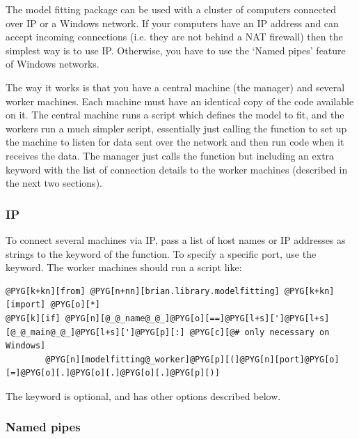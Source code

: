 \documentclass[letterpaper,10pt,english]{manual}
\begin{document}
The model fitting package can be used with a cluster of computers connected over
IP or a Windows network. If your computers have an IP address and can accept
incoming connections (i.e. they are not behind a NAT firewall) then the simplest
way is to use IP. Otherwise, you have to use the `Named pipes' feature of
Windows networks.

The way it works is that you have a central machine (the manager) and several
worker machines. Each machine must have an identical copy of the code available
on it. The central machine runs a script which defines the model to fit, and
the workers run a much simpler script, essentially just calling the
\hyperlink{brian.library.modelfitting.modelfitting_worker}{} function to set up the machine to listen for data
sent over the network and then run code when it receives the data. The manager
just calls the \hyperlink{brian.library.modelfitting.modelfitting}{} function but including an extra keyword
 with the list of connection details to the worker machines
(described in the next two sections).


\subsubsection{IP}

To connect several machines via IP, pass a list of host names or IP addresses
as strings to the  keyword of the \hyperlink{brian.library.modelfitting.modelfitting}{} function.
To specify a specific port, use the  keyword. The worker machines should
run a script like:

\begin{Verbatim}[commandchars=@\[\]]
@PYG[k+kn][from] @PYG[n+nn][brian.library.modelfitting] @PYG[k+kn][import] @PYG[o][*]
@PYG[k][if] @PYG[n][@_@_name@_@_]@PYG[o][==]@PYG[l+s][']@PYG[l+s][@_@_main@_@_]@PYG[l+s][']@PYG[p][:] @PYG[c][@# only necessary on Windows]
        @PYG[n][modelfitting@_worker]@PYG[p][(]@PYG[n][port]@PYG[o][=]@PYG[o][.]@PYG[o][.]@PYG[o][.]@PYG[p][)]
\end{Verbatim}

The  keyword is optional, and \hyperlink{brian.library.modelfitting.modelfitting_worker}{} has other
options described below.


\subsubsection{Named pipes}
\end{document}
